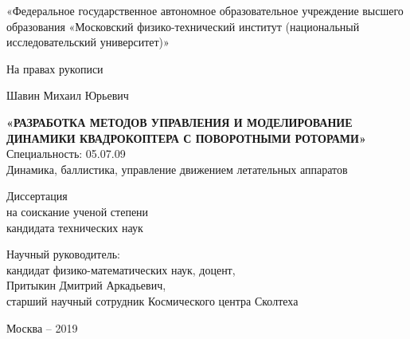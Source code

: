 \thispagestyle{empty}
\begin{comment} 
«Федеральное государственное бюджетное образовательное\\
учреждение высшего образования \\
«Московский авиационный институт \\
(национальный исследовательский университет)»
\end{comment}

\begin{center} 
«Федеральное государственное автономное образовательное учреждение высшего образования «Московский физико-технический институт (национальный исследовательский университет)»
\end{center}

{
\vskip 5mm
}

\begin{flushright}
На правах рукописи
\end{flushright}


{
   	\vskip 12mm
}

\begin{center}
	Шавин Михаил Юрьевич
\end{center}
\begin{center} 
	\textbf{«РАЗРАБОТКА МЕТОДОВ УПРАВЛЕНИЯ И МОДЕЛИРОВАНИЕ ДИНАМИКИ КВАДРОКОПТЕРА С ПОВОРОТНЫМИ РОТОРАМИ»} \\
	Специальность: 05.07.09 \\
	Динамика, баллистика, управление движением летательных аппаратов
\end{center}

{
	\vskip 6mm
}

\begin{center} 
	Диссертация \\
	на соискание ученой степени \\
	кандидата технических наук
\end{center}


{
	\vskip 12mm
}

\begin{center} 
Научный руководитель: \\
кандидат физико-математических наук, доцент, \\ 
Притыкин Дмитрий Аркадьевич, \\
старший научный сотрудник Космического центра Сколтеха \\
\vspace{5mm}
\end{center}

{
	\vskip 8mm
}

\begin{center} 
Москва -- 2019
\end{center}
